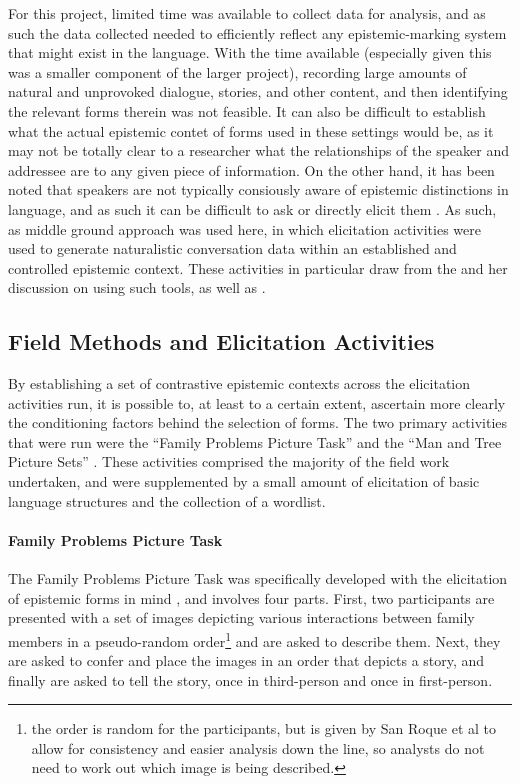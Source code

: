 For this project, limited time was available to collect data for analysis, and as such the data collected needed to efficiently reflect any epistemic-marking system that might exist in the language. With the time available (especially given this was a smaller component of the larger project), recording large amounts of natural and unprovoked dialogue, stories, and other content, and then identifying the relevant forms therein was not feasible. It can also be difficult to establish what the actual epistemic contet of forms used in these settings would be, as it may not be totally clear to a researcher what the relationships of the speaker and addressee are to any given piece of information. On the other hand, it has been noted that speakers are not typically consiously aware of epistemic distinctions in language, and as such it can be difficult to ask or directly elicit them \cite{Grzech2020}. As such, as middle ground approach was used here, in which elicitation activities were used to generate naturalistic conversation data within an established and controlled epistemic context. These activities in particular draw from the  and her discussion on using such tools, as well as . 

\subsection{Field Methods and Elicitation Activities}
By establishing a set of contrastive epistemic contexts across the elicitation activities run, it is possible to, at least to a certain extent, ascertain more clearly the conditioning factors behind the selection of forms. The two primary activities that were run were the ``Family Problems Picture Task'' \cite{SanRoque2012a} and the ``Man and Tree Picture Sets'' \cite{Levinson1992}. These activities comprised the majority of the field work undertaken, and were supplemented by a small amount of elicitation of basic language structures and the collection of a wordlist.

\paragraph{Family Problems Picture Task}\label{p:Methods:FamilyProblems}
The Family Problems Picture Task was specifically developed with the elicitation of epistemic forms in mind \cite{SanRoque2012a}, and involves four parts. First, two participants are presented with a set of images \cite{Carroll2009} depicting various interactions between family members in a pseudo-random order\footnote{the order is random for the participants, but is given by San Roque et al to allow for consistency and easier analysis down the line, so analysts do not need to work out which image is being described.} and are asked to describe them. Next, they are asked to confer and place the images in an order that depicts a story, and finally are asked to tell the story, once in third-person and once in first-person.

